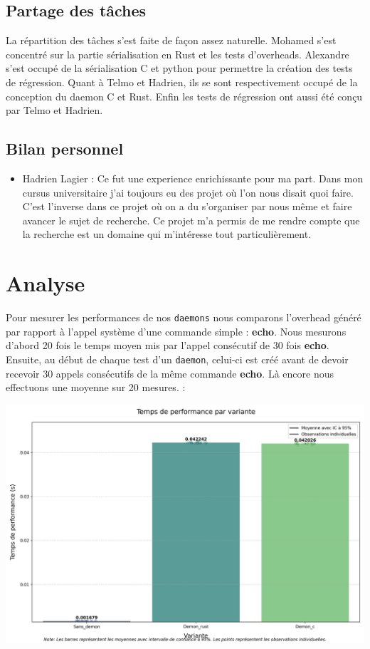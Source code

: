 \documentclass{article}
\begin{document}
\subsection{Partage des tâches}

La répartition des tâches s'est faite de façon assez naturelle. Mohamed s'est concentré sur la partie sérialisation en Rust et les tests d'overheads. Alexandre s'est occupé de la sérialisation C et python pour permettre la création des tests de régression. Quant à Telmo et Hadrien, ils se sont respectivement occupé de la conception du daemon C et Rust. Enfin les tests de régression ont aussi été conçu par Telmo et Hadrien.

\subsection{Bilan personnel}

\begin{itemize}
    \item Hadrien Lagier : Ce fut une experience enrichissante pour ma part. Dans mon cursus universitaire j'ai toujours eu des projet où l'on nous disait quoi faire. C'est l'inverse dans ce projet où on a du s'organiser par nous même et faire avancer le sujet de recherche. Ce projet m'a permis de me rendre compte que la recherche est un domaine qui m'intéresse tout particulièrement.
\end{itemize}


\section{Analyse}
\label{sec:analyse}
Pour mesurer les performances de nos \texttt{daemons} nous comparons l'overhead généré par rapport à l'appel système d'une commande simple : \textbf{echo}.
Nous mesurons d'abord 20 fois le temps moyen mis par l'appel consécutif de 30 fois \textbf{echo}. Ensuite, au début de chaque test d'un \texttt{daemon}, celui-ci est créé avant de devoir recevoir 30 appels consécutifs de la même commande \textbf{echo}. Là encore nous effectuons une moyenne sur 20 mesures. :


\centerline{\includegraphics[scale=0.4]{performance_comparison}}
\end{document}

